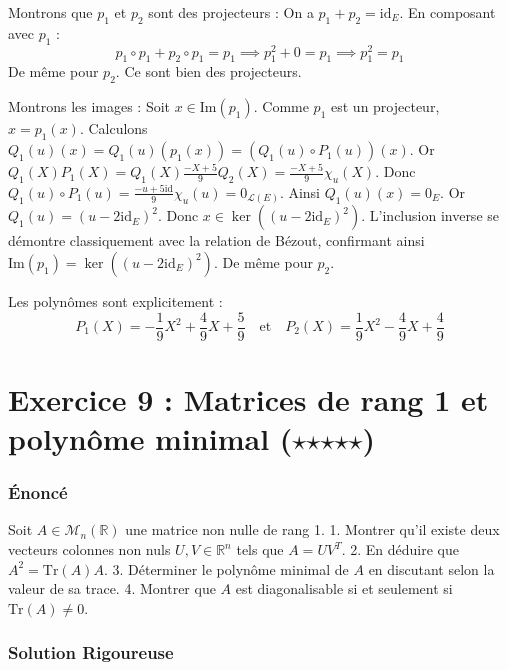 \documentclass[11pt,a4paper]{article}
\begin{document}
Montrons que $p_1$ et $p_2$ sont des projecteurs :
On a $p_1 + p_2 = \text{id}_E$. En composant avec $p_1$ :
$$p_1 \circ p_1 + p_2 \circ p_1 = p_1 \implies p_1^2 + 0 = p_1 \implies p_1^2 = p_1$$
De même pour $p_2$. Ce sont bien des projecteurs.

Montrons les images :
Soit $x \in \text{Im}(p_1)$. Comme $p_1$ est un projecteur, $x = p_1(x)$.
Calculons $Q_1(u)(x) = Q_1(u)(p_1(x)) = (Q_1(u) \circ P_1(u))(x)$.
Or $Q_1(X) P_1(X) = Q_1(X) \frac{-X+5}{9} Q_2(X) = \frac{-X+5}{9} \chi_u(X)$.
Donc $Q_1(u) \circ P_1(u) = \frac{-u+5\text{id}}{9} \chi_u(u) = 0_{\mathcal{L}(E)}$.
Ainsi $Q_1(u)(x) = 0_E$. Or $Q_1(u) = (u - 2\text{id}_E)^2$. Donc $x \in \ker((u - 2\text{id}_E)^2)$.
L'inclusion inverse se démontre classiquement avec la relation de Bézout, confirmant ainsi $\text{Im}(p_1) = \ker((u - 2\text{id}_E)^2)$.
De même pour $p_2$.

Les polynômes sont explicitement :
$$P_1(X) = -\frac{1}{9}X^2 + \frac{4}{9}X + \frac{5}{9} \quad \text{et} \quad P_2(X) = \frac{1}{9}X^2 - \frac{4}{9}X + \frac{4}{9}$$




\part{Exercice 9 : Matrices de rang 1 et polynôme minimal ($\star$$\star$$\star$$\star$$\star$)}

\section{Énoncé}

Soit $A \in \mathcal{M}_n(\mathbb{R})$ une matrice non nulle de rang 1.
1. Montrer qu'il existe deux vecteurs colonnes non nuls $U, V \in \mathbb{R}^n$ tels que $A = U V^T$.
2. En déduire que $A^2 = \text{Tr}(A) A$.
3. Déterminer le polynôme minimal de $A$ en discutant selon la valeur de sa trace.
4. Montrer que $A$ est diagonalisable si et seulement si $\text{Tr}(A) \neq 0$.

\section{Solution Rigoureuse}
\end{document}
